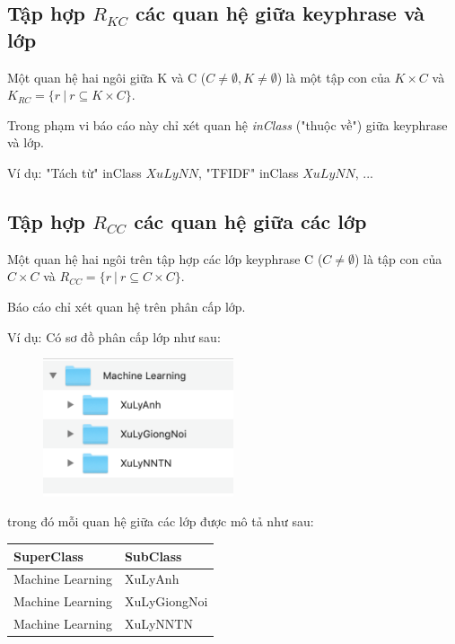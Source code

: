 \subsection{Tập hợp $R_{KC}$ các quan hệ giữa keyphrase và lớp}

Một quan hệ hai ngôi giữa K và C ($C \neq \emptyset, K \neq \emptyset$) là một tập con của $K \times C$ và $K_{RC} = \{ r\ |\ r \subseteq K \times C \}$.

Trong phạm vi báo cáo này chỉ xét quan hệ \textit{inClass} ("thuộc về") giữa keyphrase và lớp.

Ví dụ: "Tách từ" inClass $XuLyNN$, "TFIDF" inClass $XuLyNN$, ...

\subsection{Tập hợp $R_{CC}$ các quan hệ giữa các lớp}

Một quan hệ hai ngôi trên tập hợp các lớp keyphrase C ($C \neq \emptyset$) là tập con của $C \times C$ và $R_{CC} = \{ r\ |\ r \subseteq C \times C \}$.

Báo cáo chỉ xét quan hệ trên phân cấp lớp.

Ví dụ: Có sơ đồ phân cấp lớp như sau: 

\begin{figure}[H]
    \centering
    \includegraphics[width=0.5\textwidth]{img/phancapclasses.png}
\end{figure}

trong đó mỗi quan hệ giữa các lớp được mô tả như sau:

\begin{table}[H]
\centering
\begin{tabular}{|l|l|}
\hline
\textbf{SuperClass} & \textbf{SubClass} \\ \hline
Machine Learning    & XuLyAnh           \\ \hline
Machine Learning    & XuLyGiongNoi      \\ \hline
Machine Learning    & XuLyNNTN          \\ \hline
\end{tabular}
\end{table}

